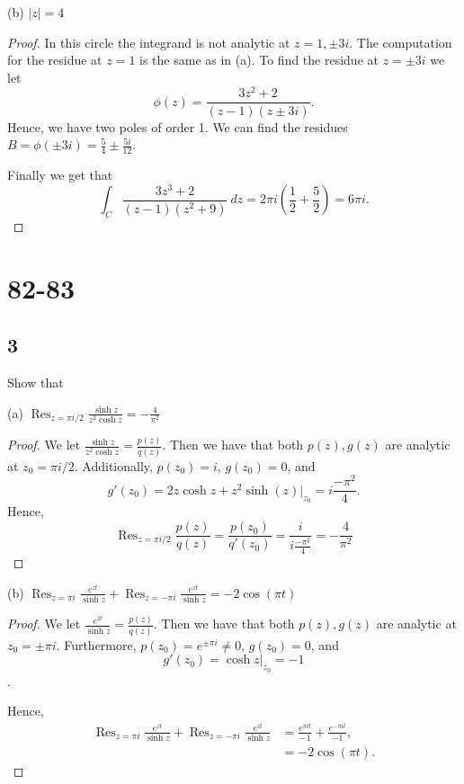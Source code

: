 \documentclass{article}
\DeclareMathOperator*{\Res}{Res}
\begin{document}
(b) $|z| = 4$
\begin{proof}
    In this circle the integrand is not analytic at $z = 1, \pm 3i$.
    The computation for the residue at $z =1$ is the same as in (a).
    To find the residue at $z = \pm 3i$ we let
    \[\phi(z) = \frac{3z^2 + 2}{(z-1)(z\pm 3i)}.\]
    Hence, we have two poles of order 1. We can find the residues
    $B = \phi(\pm 3i) = \frac{5}{4} \pm \frac{5i}{12}$.

    Finally we get that
    \[\int_C \frac{3z^3 + 2}{(z-1)(z^2 + 9)} \ dz =
        2\pi i \left(\frac{1}{2} + \frac{5}{2}\right) = 6\pi i.\]
\end{proof}

\section*{82-83}
\subsection*{3}
Show that

(a) $\Res_{z=\pi i/2} \frac{\sinh z}{z^2\cosh z} = -\frac{4}{\pi^2}$
\begin{proof}
    We let $\frac{\sinh z}{z^2 \cosh z} = \frac{p(z)}{q(z)}$. Then
    we have that both $p(z),g(z)$ are analytic at ${z_0 = \pi i/2}$. Additionally,
    $p(z_0) = i$, $g(z_0) = 0$, and
    \[g'(z_0) = 2z\cosh z + z^2\sinh(z) \big |_{z_0} = i\frac{-\pi^2}{4}.\]
    Hence,
    \begin{equation*}
        \Res_{z = \pi i/2}\frac{p(z)}{q(z)} = \frac{p(z_0)}{q'(z_0)}
        = \frac{i}{i\frac{-\pi^2}{4}} = -\frac{4}{\pi^2}
    \end{equation*}
\end{proof}

(b) $\Res_{z=\pi i} \frac{e^{zt}}{\sinh z}
    + \Res_{z=-\pi i} \frac{e^{zt}}{\sinh z} = -2\cos(\pi t)$
\begin{proof}
    We let $\frac{e^{zt}}{\sinh z} = \frac{p(z)}{q(z)}$. Then we have that
    both $p(z), g(z)$ are analytic at $z_0 = \pm \pi i$. Furthermore,
    $p(z_0) = e^{\pm \pi i} \neq 0$, $g(z_0) = 0$, and
    \[g'(z_0) = \cosh z \big |_{z_0} = -1\].

    Hence,
    \begin{align*}
        \Res_{z=\pi i} \frac{e^{zt}}{\sinh z}
        + \Res_{z=-\pi i} \frac{e^{zt}}{\sinh z}
         & = \frac{e^{\pi i t}}{-1} + \frac{e^{-\pi i t}}{-1}, \\
         & = -2\cos(\pi t).
    \end{align*}
\end{proof}
\end{document}

